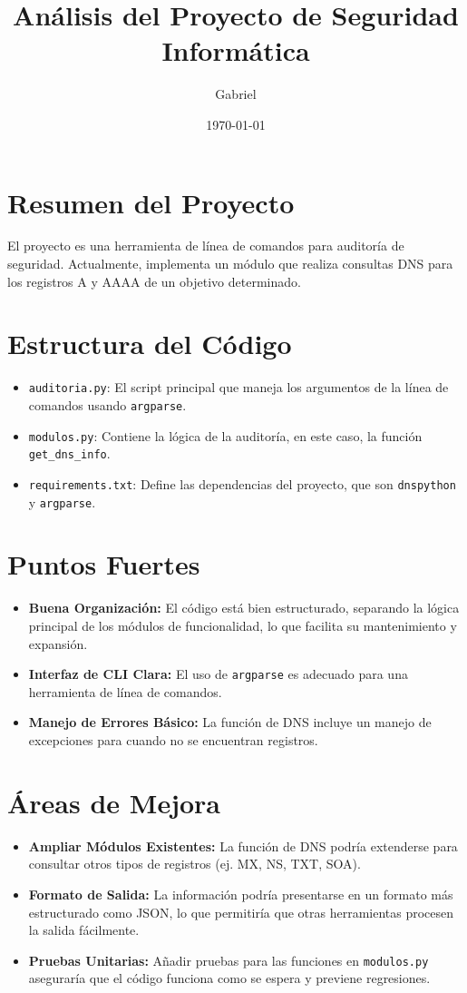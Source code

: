 \documentclass{article}
\title{Análisis del Proyecto de Seguridad Informática}
\author{Gabriel}
\date{\today}
\begin{document}
\maketitle

\section{Resumen del Proyecto}
El proyecto es una herramienta de línea de comandos para auditoría de seguridad. Actualmente, 
implementa un módulo que realiza consultas DNS para los registros A y AAAA de un objetivo 
determinado.

\section{Estructura del Código}
\begin{itemize}
    \item \texttt{auditoria.py}: El script principal que maneja los argumentos de la línea de 
    comandos usando \texttt{argparse}.
    \item \texttt{modulos.py}: Contiene la lógica de la auditoría, en este caso, la función 
    \texttt{get\_dns\_info}.
    \item \texttt{requirements.txt}: Define las dependencias del proyecto, que son 
    \texttt{dnspython} y \texttt{argparse}.
\end{itemize}

\section{Puntos Fuertes}
\begin{itemize}
    \item \textbf{Buena Organización:} El código está bien estructurado, separando la lógica 
    principal de los módulos de funcionalidad, lo que facilita su mantenimiento y expansión.
    \item \textbf{Interfaz de CLI Clara:} El uso de \texttt{argparse} es adecuado para una 
    herramienta de línea de comandos.
    \item \textbf{Manejo de Errores Básico:} La función de DNS incluye un manejo de excepciones 
    para cuando no se encuentran registros.
\end{itemize}

\section{Áreas de Mejora}
\begin{itemize}
    \item \textbf{Ampliar Módulos Existentes:} La función de DNS podría extenderse para consultar 
    otros tipos de registros (ej. MX, NS, TXT, SOA).
    \item \textbf{Formato de Salida:} La información podría presentarse en un formato más 
    estructurado como JSON, lo que permitiría que otras herramientas procesen la salida 
    fácilmente.
    \item \textbf{Pruebas Unitarias:} Añadir pruebas para las funciones en \texttt{modulos.py} 
    aseguraría que el código funciona como se espera y previene regresiones.
\end{itemize}
\end{document}
